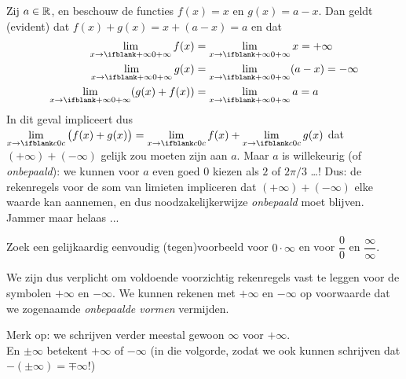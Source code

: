 \documentclass[numbers]{ximera}
\begin{document}
\begin{example}
	Zij $a\in\mathbb{R}$, en beschouw de functies $f(x)=x$ en $g(x)=a-x$. Dan geldt (evident) dat $f(x)+g(x)=x+(a-x)=a$ en dat 
	\begin{align*}
	\limxi f(x) & = \limxi x = +\infty \\
	\limxi g(x) & = \limxi (a-x) = -\infty \\
	\limxi (g(x)+f(x)) & = \limxi a = a \\
	\end{align*}
    In dit geval impliceert dus $\limx[c] \big(f(x) +g(x)\big) = \limx[c] f(x) + \limx[c] g(x)$ dat $(+\infty) + (-\infty)$ gelijk zou moeten zijn aan $a$. Maar $a$ is willekeurig (of \textit{onbepaald}): we kunnen voor $a$ even goed $0$ kiezen als $2$ of $2\pi/3$ \dots! Dus: de rekenregels voor de som van limieten impliceren dat $(+\infty)+(-\infty)$ elke waarde kan aannemen, en dus noodzakelijkerwijze \textit{onbepaald} moet blijven. Jammer maar helaas ...
    
    
\end{example}
\begin{example}
	
Zoek een gelijkaardig eenvoudig (tegen)voorbeeld voor $0\cdot\infty$ en voor $\dfrac00$ en $\dfrac\infty\infty$.
\end{example}



We zijn dus verplicht om voldoende voorzichtig rekenregels vast te leggen voor de symbolen $+\infty$ en $-\infty$. We kunnen rekenen met $+\infty$ en $-\infty$  op voorwaarde dat we zogenaamde \textit{onbepaalde vormen} vermijden.

Merk op: we schrijven verder meestal gewoon $\infty$ voor $+\infty$. \\
En $\pm\infty$ betekent $+\infty$ of $-\infty$ (in die volgorde, zodat we ook kunnen schrijven dat $-(\pm\infty) = \mp\infty$!)
\end{document}
